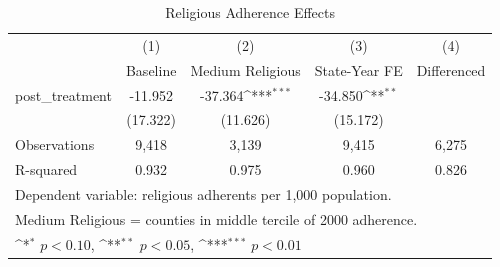 \begin{table}[h]\centering
\scriptsize
\def\sym#1{\ifmmode^{#1}\else\(^{#1}\)\fi}
\caption{Religious Adherence Effects}
\begin{tabular}{l*{4}{c}}
\hline\hline
            &\multicolumn{1}{c}{(1)}&\multicolumn{1}{c}{(2)}&\multicolumn{1}{c}{(3)}&\multicolumn{1}{c}{(4)}\\
            &\multicolumn{1}{c}{Baseline}&\multicolumn{1}{c}{Medium Religious}&\multicolumn{1}{c}{State-Year FE}&\multicolumn{1}{c}{Differenced}\\
\hline
post\_treatment&     -11.952         &     -37.364\sym{***}&     -34.850\sym{**} &                     \\
            &    (17.322)         &    (11.626)         &    (15.172)         &                     \\
\hline
Observations&       9,418         &       3,139         &       9,415         &       6,275         \\
R-squared   &       0.932         &       0.975         &       0.960         &       0.826         \\
\hline\hline
\multicolumn{5}{l}{\footnotesize Dependent variable: religious adherents per 1,000 population.}\\
\multicolumn{5}{l}{\footnotesize Medium Religious = counties in middle tercile of 2000 adherence.}\\
\multicolumn{5}{l}{\footnotesize \sym{*} \(p<0.10\), \sym{**} \(p<0.05\), \sym{***} \(p<0.01\)}\\
\end{tabular}
\end{table}